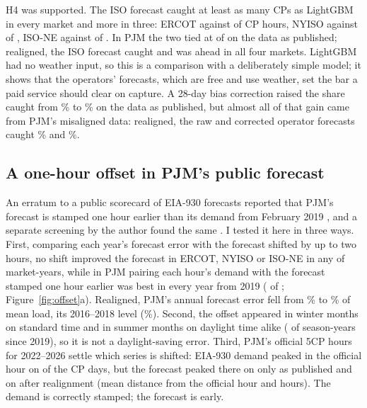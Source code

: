 \documentclass[preprint,12pt,authoryear]{elsarticle}
\begin{document}
H4 was supported. The ISO forecast caught at least as many CPs as LightGBM in every market and more in three: ERCOT  against  of  CP hours, NYISO  against  of , ISO-NE  against  of . In PJM the two tied at  of  on the data as published; realigned, the ISO forecast caught  and was ahead in all four markets. LightGBM had no weather input, so this is a comparison with a deliberately simple model; it shows that the operators' forecasts, which are free and use weather, set the bar a paid service should clear on capture. A 28-day bias correction raised the share caught from \% to \% on the data as published, but almost all of that gain came from PJM's misaligned data: realigned, the raw and corrected operator forecasts caught \% and \%.

\subsection{A one-hour offset in PJM's public forecast}
\label{sec:offset}

An erratum to a public scorecard of EIA-930 forecasts reported that PJM's forecast is stamped one hour earlier than its demand from February 2019 \citep{guerrafilho2026scorecard}, and a separate screening by the author found the same \citep{nguyen2026eia930}. I tested it here in three ways. First, comparing each year's forecast error with the forecast shifted by up to two hours, no shift improved the forecast in ERCOT, NYISO or ISO-NE in any of  market-years, while in PJM pairing each hour's demand with the forecast stamped one hour earlier was best in every year from 2019 ( of ; Figure~\ref{fig:offset}a). Realigned, PJM's annual forecast error fell from \% to \% of mean load, its 2016--2018 level (\%). Second, the offset appeared in winter months on standard time and in summer months on daylight time alike ( of  season-years since 2019), so it is not a daylight-saving error. Third, PJM's official 5CP hours for 2022--2026 \citep{pjm5cp} settle which series is shifted: EIA-930 demand peaked in the official hour on  of the  CP days, but the forecast peaked there on only  as published and on  after realignment (mean distance from the official hour  and  hours). The demand is correctly stamped; the forecast is early.
\end{document}
